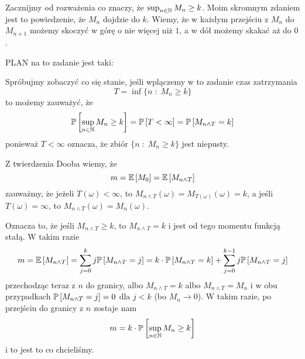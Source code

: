 \begin{solution}
  Zacznijmy od rozważenia co znaczy, że $\sup_{n\in\operatorname{\mathbb{N}}}M_n\geq k$. Moim skromnym zdaniem jest to powiedzenie, że $M_n$ dojdzie do $k$. Wiemy, że w każdym przejściu z $M_n$ do $M_{n+1}$ możemy skoczyć w górę o nie więcej niż $1$, a w dół możemy skakać aż do $0$.

  PLAN na to zadanie jest taki:
  \begin{center}
  \end{center}

  Spróbujmy zobaczyć co się stanie, jeśli wplączemy w to zadanie czas zatrzymania
  $$T=\inf\{n\;:\;M_n\geq k\}$$
  to możemy zauważyć, że 
  $$\prob{\sup_{n\in\N}M_n\geq k}=\prob{T<\infty}=\prob{M_{n\land T}=k}$$
  ponieważ $T<\infty$ oznacza, że zbiór $\{n\;:\;M_n\geq k\}$ jest niepusty.

  Z twierdzenia Dooba wiemy, że
  $$m=\expected{M_0}=\expected{M_{n\land T}}$$
  zauważmy, że jeżeli $T(\omega)<\infty$, to $M_{n\land T}(\omega)=M_{T(\omega)}(\omega)=k$, a jeśli $T(\omega)=\infty$, to $M_{n\land T}(\omega)=M_n(\omega)$. 

  Oznacza to, że jeśli $M_{n\land T}\geq k$, to $M_{n\land T}=k$ i jest od tego momentu funkcją stałą. W takim razie
  $$m=\expected{M_{n\land T}}=\sum_{j=0}^kj\prob{M_{n\land T}=j}=k\cdot\prob{M_{n\land T}=k}+\sum_{j=0}^{k-1}j\prob{M_{n\land T}=j}$$
  przechodząc teraz z $n$ do granicy, albo $M_{n\land T}=k$ albo $M_{n\land T}=M_n$ i w obu przypadkach $\prob{M_{n\land T}=j}=0$ dla $j<k$ (bo $M_n\to 0$). W takim razie, po przejściu do granicy z $n$ zostaje nam
  $$m=k\cdot\prob{\sup_{n\in\N}M_n\geq k}$$
  i to jest to co chcieliśmy.
\end{solution}

